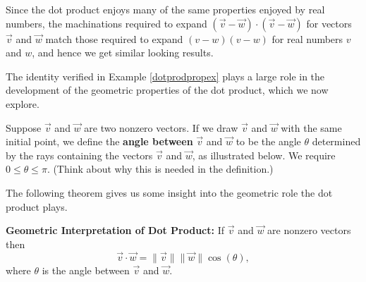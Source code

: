 \documentclass{ximera}
\begin{document}
 

Since the dot product enjoys many of the same properties enjoyed by real numbers,  the machinations required to expand  $(\overrightarrow{v} - \overrightarrow{w}) \cdot (\overrightarrow{v} - \overrightarrow{w})$ for vectors $\overrightarrow{v}$ and $\overrightarrow{w}$ match those required to expand $(v-w)(v-w)$ for real numbers $v$ and $w$, and hence we get similar looking results.  

 

The identity verified in Example \ref{dotprodpropex} plays a large role in the development of the geometric properties of the dot product, which we now explore.

 

Suppose $\overrightarrow{v}$ and $\overrightarrow{w}$ are two nonzero vectors.  If we draw $\overrightarrow{v}$ and $\overrightarrow{w}$ with the same initial point, we define the \textbf{angle between} $\overrightarrow{v}$ and $\overrightarrow{w}$ to be the angle $\theta$ determined by the rays containing the vectors $\overrightarrow{v}$ and $\overrightarrow{w}$, as illustrated below.  We require $0 \leq \theta \leq \pi$.  (Think about why this is needed in the definition.)

\begin{center} 
\end{center}

The following theorem gives us some insight into the geometric role the dot product plays.

 

\begin{theorem} \label{dotproductgeo} \textbf{Geometric Interpretation of Dot Product:}  If $\overrightarrow{v}$ and $\overrightarrow{w}$ are nonzero vectors then \[ \overrightarrow{v} \cdot \overrightarrow{w} = \|\overrightarrow{v}\| \|\overrightarrow{w}\| \cos(\theta),\] where $\theta$ is the angle between $\overrightarrow{v}$ and $\overrightarrow{w}$.  

 

\end{theorem}

 
\end{document}
